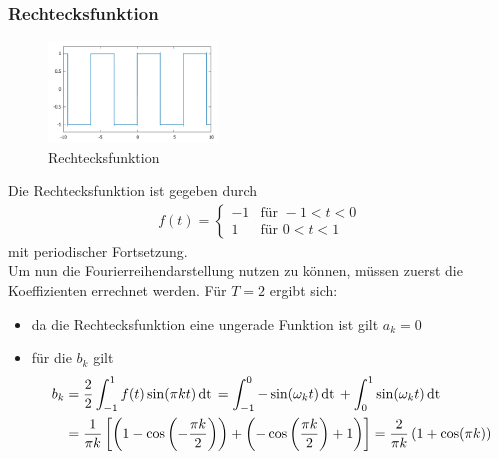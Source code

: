             \subsubsection*{Rechtecksfunktion}
        \begin{figure}
            \vspace{10pt}
            \centering
            \includegraphics[width=0.4\textwidth]{Abb/rechteck.pdf}
            \caption{Rechtecksfunktion}
            \label{rechteck}
            \vspace{10pt}
        \end{figure}
Die Rechtecksfunktion ist gegeben durch
        \begin{align*}
            f(t) = \begin{cases}
                -1 & \text{für } -1 < t < 0 \\
                 1 & \text{für }  0 < t < 1
            \end{cases}   
        \end{align*}
mit periodischer Fortsetzung.\\
Um nun die Fourierreihendarstellung nutzen zu können, müssen zuerst die Koeffizienten
errechnet werden. Für $T=2$ ergibt sich:
        \begin{itemize}
            \item da die Rechtecksfunktion eine ungerade Funktion ist gilt $a_k = 0$
            \item für die $b_k$ gilt
                \begin{align*}
                   b_k &=\frac{2}{2} \int_{-1}^{1} f(t) \sin(\pi k t ) \,\text{dt}\, = 
                   \int_{-1}^{0} - \sin(\omega_k t) \,\text{dt}\, 
                   + \int_0^1 \sin(\omega_k t ) \,\text{dt}\, \\
                   &= \frac{1}{\pi k} \left[
                       \left(1 - \cos
                        \left(-\frac{\pi k}{2}
                        \right)
                       \right)
                     + \left(-\cos
                        \left( \frac{\pi k}{2}
                        \right) + 1
                       \right)
                    \right]
                    = \frac{2}{\pi k} \left( 1 + \cos(\pi k)\right)
                \end{align*}
            \end{itemize}
